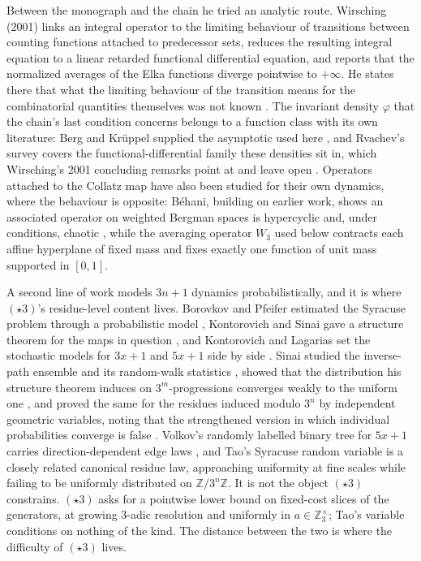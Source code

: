 \documentclass[11pt]{article}
\theoremstyle{definition}
\theoremstyle{remark}
\begin{document}
Between the monograph and the chain he tried an analytic route.
Wirsching (2001) links an integral operator to the limiting behaviour of
transitions between counting functions attached to predecessor sets,
reduces the resulting integral equation to a linear retarded functional
differential equation, and reports that the normalized averages of the
Elka functions diverge pointwise to $+\infty$. He states there that what
the limiting behaviour of the transition means for the combinatorial
quantities themselves was not known \cite[\S\S1,5]{Wirsching2001}. The invariant density $\varphi$ that the
chain's last condition concerns belongs to a function class with its own
literature: Berg and Kr\"uppel supplied the asymptotic used here
\cite{BergKruppel1998}, and Rvachev's survey covers the
functional-differential family these densities sit in, which Wirsching's
2001 concluding remarks point at and leave open
\cite{Rvachev1990,Wirsching2001}. Operators attached to the Collatz map have also
been studied for their own dynamics, where the behaviour is opposite:
B\'ehani, building on earlier work, shows an associated operator on weighted
Bergman spaces is hypercyclic and, under conditions, chaotic
\cite{Behani2024}, while the averaging operator $W_3$ used below
contracts each affine hyperplane of fixed mass and fixes exactly one
function of unit mass supported in $[0,1]$.

A second line of work models $3n+1$ dynamics probabilistically, and it
is where $(\star3)$'s residue-level content lives. Borovkov and Pfeifer
estimated the Syracuse problem through a probabilistic model
\cite{BorovkovPfeifer2000}, Kontorovich and Sinai gave a structure
theorem for the maps in question \cite{KontorovichSinai2002}, and
Kontorovich and Lagarias set the stochastic models for $3x+1$ and
$5x+1$ side by side \cite{KontorovichLagarias2010}. Sinai studied the
inverse-path ensemble and its random-walk statistics
\cite{Sinai2003}, showed that the distribution his structure theorem
induces on $3^m$-progressions converges weakly to the uniform one
\cite[Theorem~1]{Sinai2003MMJ}, and proved the same for the residues
induced modulo $3^n$ by independent geometric variables, noting that
the strengthened version in which individual probabilities converge is
false \cite{Sinai2004}. Volkov's randomly labelled binary
tree for $5x+1$ carries direction-dependent edge laws
\cite{Volkov2006}, and Tao's Syracuse random variable \cite{Tao2022}
is a closely related canonical residue law, approaching uniformity at
fine scales while failing to be uniformly distributed on
$\mathbb Z/3^n\mathbb Z$. It is not the object $(\star3)$ constrains.
$(\star3)$ asks for a pointwise lower bound on fixed-cost slices of the
generators, at growing $3$-adic resolution and uniformly in
$a\in\mathbb Z_3^\times$; Tao's variable conditions on nothing of the
kind. The distance between the two is where the difficulty of
$(\star3)$ lives.
\end{document}
